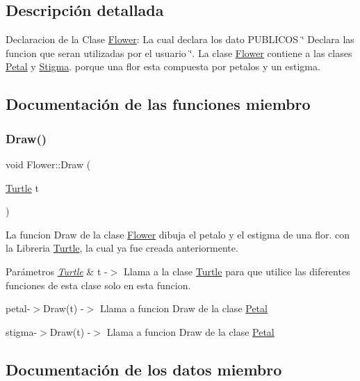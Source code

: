 \subsection{Descripción detallada}
Declaracion de la Clase \mbox{\hyperlink{class_flower}{Flower}}\+: La cual declara los dato P\+U\+B\+L\+I\+C\+OS \char`\"{} Declara las funcion que seran utilizadas por el usuario \char`\"{}. La clase \mbox{\hyperlink{class_flower}{Flower}} contiene a las clases \mbox{\hyperlink{class_petal}{Petal}} y \mbox{\hyperlink{class_stigma}{Stigma}}. porque una flor esta compuesta por petalos y un estigma. 

\subsection{Documentación de las funciones miembro}
\mbox{\label{class_flower_aa7dd1098de847a6d210e10bc64dfcf31}} 
\subsubsection{\texorpdfstring{Draw()}{Draw()}}
{\footnotesize\ttfamily void Flower\+::\+Draw (\begin{DoxyParamCaption}\item[{\mbox{\hyperlink{class_turtle}{Turtle}}}]{t }\end{DoxyParamCaption})\hspace{0.3cm}{\ttfamily [inline]}}



La funcion Draw de la clase \mbox{\hyperlink{class_flower}{Flower}} dibuja el petalo y el estigma de una flor. con la Libreria \mbox{\hyperlink{class_turtle}{Turtle}}, la cual ya fue creada anteriormente. 


\begin{DoxyParams}{Parámetros}
{\em \mbox{\hyperlink{class_turtle}{Turtle}}} & t -\/$>$ Llama a la clase \mbox{\hyperlink{class_turtle}{Turtle}} para que utilice las diferentes funciones de esta clase solo en esta funcion. \\
\hline
\end{DoxyParams}
petal-\/$>$Draw(t) -\/$>$ Llama a funcion Draw de la clase \mbox{\hyperlink{class_petal}{Petal}}

stigma-\/$>$Draw(t) -\/$>$ Llama a funcion Draw de la clase \mbox{\hyperlink{class_petal}{Petal}} 

\subsection{Documentación de los datos miembro}
\mbox{\label{class_flower_af0f1dc8c951cb056cf77409ca06d96f7}} 
